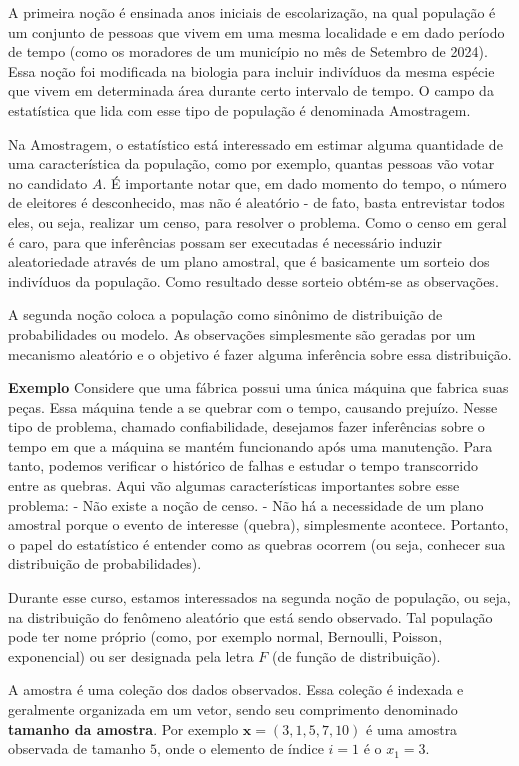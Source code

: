 \documentclass[
  letterpaper,
  DIV=11,
  numbers=noendperiod]{scrartcl}
\begin{document}
A primeira noção é ensinada anos iniciais de escolarização, na qual
população é um conjunto de pessoas que vivem em uma mesma localidade e
em dado período de tempo (como os moradores de um município no mês de
Setembro de 2024). Essa noção foi modificada na biologia para incluir
indivíduos da mesma espécie que vivem em determinada área durante certo
intervalo de tempo. O campo da estatística que lida com esse tipo de
população é denominada Amostragem.

Na Amostragem, o estatístico está interessado em estimar alguma
quantidade de uma característica da população, como por exemplo, quantas
pessoas vão votar no candidato \(A\). É importante notar que, em dado
momento do tempo, o número de eleitores é desconhecido, mas não é
aleatório - de fato, basta entrevistar todos eles, ou seja, realizar um
censo, para resolver o problema. Como o censo em geral é caro, para que
inferências possam ser executadas é necessário induzir aleatoriedade
através de um plano amostral, que é basicamente um sorteio dos
indivíduos da população. Como resultado desse sorteio obtém-se as
observações.

A segunda noção coloca a população como sinônimo de distribuição de
probabilidades ou modelo. As observações simplesmente são geradas por um
mecanismo aleatório e o objetivo é fazer alguma inferência sobre essa
distribuição.

\textbf{Exemplo} Considere que uma fábrica possui uma única máquina que
fabrica suas peças. Essa máquina tende a se quebrar com o tempo,
causando prejuízo. Nesse tipo de problema, chamado confiabilidade,
desejamos fazer inferências sobre o tempo em que a máquina se mantém
funcionando após uma manutenção. Para tanto, podemos verificar o
histórico de falhas e estudar o tempo transcorrido entre as quebras.
Aqui vão algumas características importantes sobre esse problema: - Não
existe a noção de censo. - Não há a necessidade de um plano amostral
porque o evento de interesse (quebra), simplesmente acontece. Portanto,
o papel do estatístico é entender como as quebras ocorrem (ou seja,
conhecer sua distribuição de probabilidades).

Durante esse curso, estamos interessados na segunda noção de população,
ou seja, na distribuição do fenômeno aleatório que está sendo observado.
Tal população pode ter nome próprio (como, por exemplo normal,
Bernoulli, Poisson, exponencial) ou ser designada pela letra \(F\) (de
função de distribuição).

A amostra é uma coleção dos dados observados. Essa coleção é indexada e
geralmente organizada em um vetor, sendo seu comprimento denominado
\textbf{tamanho da amostra}. Por exemplo \(\textbf{x}=(3,1,5,7,10)\) é
uma amostra observada de tamanho \(5\), onde o elemento de índice
\(i=1\) é o \(x_1=3\).
\end{document}
